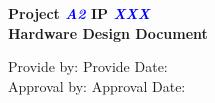 

\begin{titlepage}
    \thispagestyle{fancy}
    \fancyhead[L]{}
    \fancyhead[C]{}

    \fancyfoot[L]{}
    \fancyfoot[R]{}
    \fancyfoot[C]{{\textcolor{grey}{Copyright©1995-2023 BYD Company Ltd. All rights reserved}}}
    \renewcommand{\headrulewidth}{0.1pt}

    \begin{center}
        \vspace*{8cm}
        
        \Huge\textbf{Project \textcolor{blue}{\textit{A2}} IP \textcolor{blue}{\textit{XXX}} \\Hardware Design Document}
 
        \vspace*{8cm}
        
        \raggedright
        \hspace*{0.2cm}
        \normalsize{Provide by: \underline{\hspace*{4cm}}} %
        \hspace*{1.8cm}
        \normalsize{Provide Date: \underline{\hspace*{4cm}}}\\
        \vspace*{0.5cm}
        \hspace*{0.2cm}
        \normalsize{Approval by: \underline{\hspace*{4cm}}}
        \hspace*{1.6cm}
        \normalsize{Approval Date: \underline{\hspace*{4cm}}}
    \end{center}

\end{titlepage}